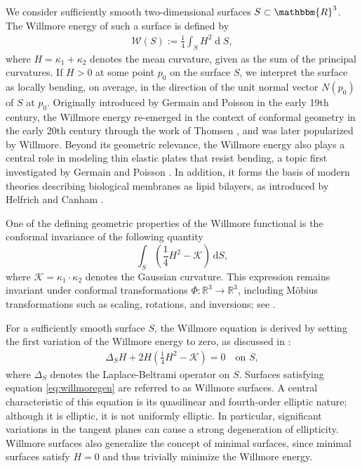 \documentclass[12pt,a4paper,twoside]{article}
\newcommand{\R}{\mathbbm {R}}
\newcommand{\W}{\mathcal {W}}
\newcommand{\diff}{\operatorname{d}\!}
\begin{document}
We consider sufficiently smooth two-dimensional surfaces $S\subset\R^3$. The Willmore energy of such a surface is defined by
\begin{align}
    \W(S):= \frac{1}{4}\int_S H^2\diff S \label{eq:meinewilldef},
\end{align}
 where $H=\kappa_1+\kappa_2$ denotes the mean curvature, given as the sum of the principal curvatures. If \( H > 0 \) at some point \( p_0 \) on the surface \( S \), we interpret the surface as locally bending, on average, in the direction of the unit normal vector \( N(p_0) \) of \( S \) at \( p_0 \). Originally introduced by Germain and Poisson  \cite{germain1821recherches} in the early 19th century, the Willmore energy re-emerged in the context of conformal geometry in the early 20th century through the work of Thomsen \cite{thomsen1924grundlagen}, and was later popularized by Willmore. Beyond its geometric relevance, the Willmore energy also plays a central role in modeling thin elastic plates that resist bending, a topic first investigated by Germain and Poisson \cite{germain1821recherches}. In addition, it forms the basis of modern theories describing biological membranes as lipid bilayers, as introduced by Helfrich and Canham \cite{helfrich1973elastic, canham1970minimum}.

One of the defining geometric properties of the Willmore functional is the conformal invariance of the  following quantity
\[
\int_S \left( \frac{1}{4} H^2 - \mathcal{K} \right) \, \mathrm{d}S,
\]
where \( \mathcal{K} = \kappa_1 \cdot \kappa_2 \) denotes the Gaussian curvature. This expression remains invariant under conformal transformations \( \Phi\colon \mathbb{R}^3 \to \mathbb{R}^3 \), including Möbius transformations such as scaling, rotations, and inversions; see \cite{willmore1996riemannian}. 

For a sufficiently smooth surface \( S \), the Willmore equation is derived by setting the first variation of the Willmore energy to zero, as discussed in \cite[p.7, Remark 2.3, (2.1)]{dall2012uniqueness}:
\begin{align}
    \Delta_S H + 2 H\left( \frac{1}{4} H^2 - \mathcal{K} \right) = 0 \quad \text{on } S, \label{eq:willmoregen}
\end{align}
where \( \Delta_S \) denotes the Laplace-Beltrami operator on \( S \). Surfaces satisfying equation \eqref{eq:willmoregen} are referred to as Willmore surfaces. A central characteristic of this equation is its quasilinear and fourth-order elliptic nature; although it is elliptic, it is not uniformly elliptic.  In particular, significant variations in the tangent planes can cause a strong degeneration of ellipticity. Willmore surfaces also generalize the concept of minimal surfaces, since minimal surfaces satisfy \( H = 0 \) and thus trivially minimize the Willmore energy.  
\end{document}
